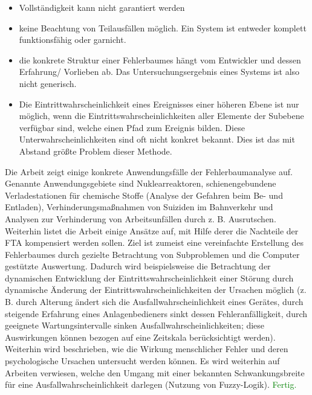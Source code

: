\begin{itemize}
\begin{itemize}
  \item Vollst\"andigkeit kann nicht garantiert werden
  \item keine Beachtung von Teilausf\"allen m\"oglich. Ein System ist entweder komplett funktionsf\"ahig oder garnicht. 
  \item die konkrete Struktur einer Fehlerbaumes h\"angt vom Entwickler und dessen Erfahrung/ Vorlieben ab. Das Untersuchungsergebnis eines Systems ist also nicht generisch.  
  \item Die Eintrittwahrscheinlichkeit eines Ereignisses einer h\"oheren Ebene ist nur m\"oglich, wenn die Eintrittswahrscheinlichkeiten aller Elemente der Subebene verf\"ugbar sind, welche einen Pfad zum Ereignis bilden. Diese Unterwahrscheinlichkeiten sind oft nicht konkret bekannt. Dies ist das mit Abstand gr\"o\ss{}te Problem dieser Methode.
  \end{itemize}
\end{itemize}
Die Arbeit zeigt einige konkrete Anwendungsf\"alle der Fehlerbaumanalyse auf. Genannte  Anwendungsgebiete sind Nuklearreaktoren, schienengebundene Verladestationen f\"ur chemische Stoffe (Analyse der Gefahren beim Be- und Entladen), Verhinderungsma\ss{}nahmen von Suiziden im Bahnverkehr und Analysen zur Verhinderung von Arbeitsunf\"allen durch z. B. Ausrutschen. \hfill \newline
Weiterhin listet die Arbeit einige Ans\"atze auf, mit Hilfe derer die Nachteile der FTA kompensiert werden sollen. Ziel ist zumeist eine vereinfachte Erstellung des Fehlerbaumes durch  gezielte Betrachtung von Subproblemen und die Computer gest\"utzte Auswertung. Dadurch wird beispielsweise die Betrachtung der dynamischen Entwicklung der Eintrittswahrscheinlichkeit einer St\"orung durch dynamische \"Anderung der Eintrittswahrscheinlichkeiten der Ursachen m\"oglich (z. B. durch Alterung \"andert sich die Ausfallwahrscheinlichkeit eines Ger\"ates, durch steigende Erfahrung eines Anlagenbedieners sinkt dessen Fehleranf\"alligkeit, durch geeignete Wartungsintervalle sinken Ausfallwahrscheinlichkeiten; diese Auswirkungen k\"onnen bezogen auf eine Zeitskala ber\"ucksichtigt werden). Weiterhin wird beschrieben, wie die Wirkung menschlicher Fehler und deren psychologische Ursachen untersucht werden k\"onnen. Es wird weiterhin auf Arbeiten verwiesen, welche den Umgang mit einer bekannten Schwankungsbreite f\"ur eine Ausfallwahrscheinlichkeit darlegen (Nutzung von Fuzzy-Logik).  \hfill \newline
\textcolor{green}{Fertig.} 


